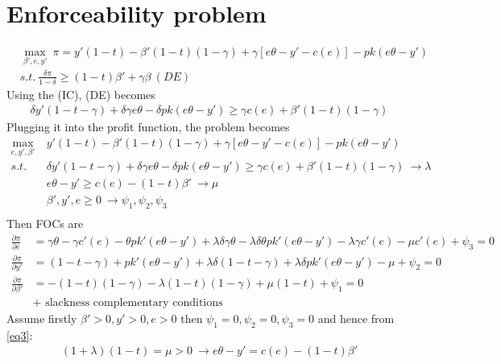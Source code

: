 \documentclass[a4paper]{article}
\begin{document}
\section{Enforceability problem}
\begin{align*}
&\underset{\beta', e, y'}{\max}\ \pi = y'(1 - t) - \beta'(1-t)(1 - \gamma) + \gamma[e\theta - y' - c(e)] - pk(e\theta - y')\\
&s.t.\ \frac{\delta \pi}{1 - \delta} \ge (1-t)\beta' + \gamma \beta\ (DE) 
\end{align*}
Using the (IC), (DE) becomes
\begin{align*}
\delta y'(1 - t - \gamma) + \delta \gamma e \theta - \delta p k(e \theta - y') \ge \gamma c(e) + \beta'(1-t)(1 - \gamma)
\end{align*}
Plugging it into the profit function, the problem becomes
\begin{align*}
\underset{e, y', \beta'}{\max}\ &y'(1 - t) - \beta'(1-t)(1 - \gamma) + \gamma[e\theta - y' - c(e)] - pk(e\theta - y')\\
s.t.\ &\delta y'(1 - t - \gamma) + \delta \gamma e \theta - \delta p k(e \theta - y') \ge \gamma c(e) + \beta'(1-t)(1 - \gamma)\ \to \lambda \\
& e\theta - y' \ge c(e) - (1 - t)\beta'\ \to \mu \\
& \beta', y', e \ge 0\ \to \psi_1, \psi_2, \psi_3\ \\
\end{align*}
Then FOCs are 
\begin{align}
\frac{\partial \pi}{\partial e} &= \gamma \theta - \gamma c'(e)- \theta p k'(e \theta - y') + \lambda \delta \gamma \theta - \lambda \delta \theta pk'(e \theta - y') - \lambda \gamma c'(e) - \mu c'(e) + \psi_3= 0\label{eq1}\\
\frac{\partial \pi}{\partial y'} &= (1 - t - \gamma)+pk'(e\theta - y') + \lambda \delta (1 - t - \gamma) +\lambda \delta pk'(e\theta - y') - \mu + \psi_2 = 0\label{eq2}\\
\frac{\partial \pi}{\partial \beta'} &= -(1-t)(1-\gamma) - \lambda (1-t)(1-\gamma) + \mu(1 - t) + \psi_1= 0\label{eq3}\\
&+\text{ slackness complementary conditions}\nonumber
\end{align}
Assume firstly $\beta' > 0, y' > 0, e > 0$ then $\psi_1 = 0, \psi_2 = 0, \psi_3= 0$ and hence from \eqref{eq3}:
\begin{align*}
(1 + \lambda)(1 - t) = \mu > 0\ \to e \theta - y' = c(e) - (1 - t)\beta'
\end{align*}
\end{document}
